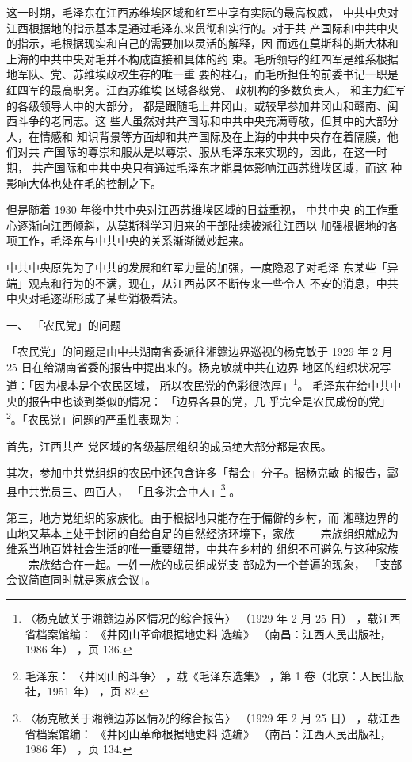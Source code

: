 这一时期，毛泽东在江西苏维埃区域和红军中享有实际的最高权威，
中共中央对江西根据地的指示基本是通过毛泽东来贯彻和实行的。对于共
产国际和中共中央的指示，毛根据现实和自己的需要加以灵活的解释，因
而远在莫斯科的斯大林和上海的中共中央对毛并不构成直接和具体的约
束。毛所领导的红四军是维系根据地军队、党、苏维埃政权生存的唯一重
要的柱石，而毛所担任的前委书记一职是红四军的最高职务。江西苏维埃
区域各级党、
政机构的多数负责人，
和主力红军的各级领导人中的大部分，
都是跟随毛上井冈山，或较早参加井冈山和赣南、闽西斗争的老同志。这
些人虽然对共产国际和中共中央充满尊敬，但其中的大部分人，在情感和
知识背景等方面却和共产国际及在上海的中共中央存在着隔膜，他们对共
产国际的尊崇和服从是以尊崇、服从毛泽东来实现的，因此，在这一时期，
共产国际和中共中央只有通过毛泽东才能具体影响江西苏维埃区域，而这
种影响大体也处在毛的控制之下。

但是随着 1930 年後中共中央对江西苏维埃区域的日益重视，
中共中央
的工作重心逐渐向江西倾斜，从莫斯科学习归来的干部陆续被派往江西以
加强根据地的各项工作，毛泽东与中共中央的关系渐渐微妙起来。
 
中共中央原先为了中共的发展和红军力量的加强，一度隐忍了对毛泽
东某些「异端」观点和行为的不满，现在，从江西苏区不断传来一些令人
不安的消息，中共中央对毛逐渐形成了某些消极看法。

一、
「农民党」的问题

「农民党」的问题是由中共湖南省委派往湘赣边界巡视的杨克敏于
1929 年 2 月 25 日在给湖南省委的报告中提出来的。杨克敏就中共在边界
地区的组织状况写道：「因为根本是个农民区域，
所以农民党的色彩很浓厚」\footnote{〈杨克敏关于湘赣边苏区情况的综合报告〉
（1929 年 2 月 25 日）
，载江西省档案馆编：
《井冈山革命根据地史料
选编》
（南昌：江西人民出版社，1986 年）
，页 136.}。
毛泽东在给中共中央的报告中也谈到类似的情况：
「边界各县的党，几
乎完全是农民成份的党」\footnote{ 毛泽东：
〈井冈山的斗争〉
，载《毛泽东选集》
，第 1 卷（北京：人民出版社，1951 年）
，页 82.}。「农民党」问题的严重性表现为：

首先，江西共产
党区域的各级基层组织的成员绝大部分都是农民。

其次，参加中共党组织的农民中还包含许多「帮会」分子。据杨克敏
的报告，酃县中共党员三、四百人，
「且多洪会中人」\footnote{ 〈杨克敏关于湘赣边苏区情况的综合报告〉
（1929 年 2 月 25 日）
，载江西省档案馆编：
《井冈山革命根据地史料
选编》
（南昌：江西人民出版社，1986 年）
，页 134.} 。

第三，地方党组织的家族化。由于根据地只能存在于偏僻的乡村，而
湘赣边界的山地又基本上处于封闭的自给自足的自然经济环境下，家族—
—宗族组织就成为维系当地百姓社会生活的唯一重要纽带，中共在乡村的
组织不可避免与这种家族——宗族结合在一起。一姓一族的成员组成党支
部成为一个普遍的现象，
「支部会议简直同时就是家族会议」。

